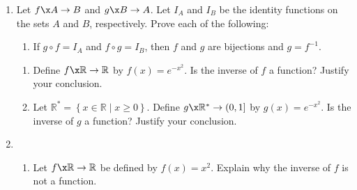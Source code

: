 \begin{enumerate}
\item Let  $f\x A \to B$ and  $g\x B \to A$.  Let  $I_A $ and  $I_B $ be the identity functions on the sets  $A$  and  $B$, respectively.  Prove each of the following:

\begin{enumerate}
  \yitem If  $g \circ f = I_A $, then  $f$  is an injection.

  \yitem If  $f \circ g = I_B $, then  $f$  is a surjection.

  \item If  $g \circ f = I_A $  and  $f \circ g = I_B $, then  $f$ and $g$ are bijections and  
$g = f^{ - 1} $.
\end{enumerate} \label{exer:compequalidentity}

%
%
%
%

\xitem \label{exer:sec65-6} \begin{enumerate} 
\item Define  $f\x \mathbb{R} \to \mathbb{R}$  by  
$f( x ) = e^{ - x^2 } $.  Is the inverse of  $f$  a function?  Justify your conclusion.

  \item Let  
$\mathbb{R}^*  = \left\{ { {x \in \mathbb{R} } \mid x \geq 0} \right\}$.  Define
$g\x \mathbb{R}^*  \to ( {0, 1} ]$ by  $g( x ) = e^{ - x^2 } $.  Is the inverse of  $g$  a function?  Justify your conclusion.
\end{enumerate}

\item %
\begin{enumerate}
  \item Let  $f\x \mathbb{R} \to \mathbb{R}$ be defined by  $f( x ) = x^2 $.  Explain why the inverse of  $f$  is not a function. \label{exer:restrictdoma}


\end{enumerate}
\end{enumerate}
